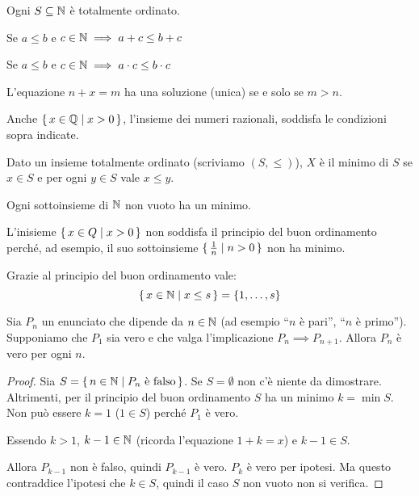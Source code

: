 \begin{remark}
Ogni $S \subseteq \mathbb N$ è totalmente ordinato.
\end{remark}

Se $a \le b$ e $c \in \mathbb N \implies a+c \le b+c$

Se $a \le b$ e $c \in \mathbb N \implies a \cdot c \le b \cdot c$ 

L'equazione $n+x=m$ ha una soluzione (unica) se e solo se $m > n$.

Anche $\set{x \in \mathbb Q| x > 0}$, l'insieme dei numeri razionali, soddisfa le condizioni sopra indicate.

\begin{definition}
Dato un insieme totalmente ordinato (scriviamo $(S, \le)$), $X$ è il minimo di $S$ se $x \in S$ e per ogni $y \in S$ vale $x \le y$.
\end{definition}

\begin{proposition}
Ogni sottoinsieme di $\mathbb N$ non vuoto ha un minimo.
\end{proposition}

\begin{example}
L'inisieme $\set{x \in Q | x > 0}$ non soddisfa il principio del buon ordinamento perché, ad esempio, il suo sottoinsieme $\set{\frac{1}{n} | n > 0}$ non ha minimo.
\end{example}

\begin{remark}
Grazie al principio del buon ordinamento vale: 
\begin{equation*}
\set{x \in \mathbb N| x \le s} = \{1, \ldots, s\}
\end{equation*}
\end{remark}

\begin{proposition}
Sia $P_n$ un enunciato che dipende da $n \in \mathbb N$ (ad esempio ``$n$ è pari'', ``$n$ è primo''). Supponiamo che $P_1$ sia vero e che valga l'implicazione $P_n \implies P_{n+1}$. Allora $P_n$ è vero per ogni $n$.
\end{proposition}

\begin{proof}
Sia $S = \set{n \in \mathbb N| P_n \text{ è falso}}$.
Se $S = \emptyset$ non c'è niente da dimostrare.
Altrimenti, per il principio del buon ordinamento $S$ ha un minimo $k = \min S$. Non può essere $k = 1$ ($1 \in S$) perché $P_1$ è vero.

Essendo $k>1$, $k-1 \in \mathbb N$ (ricorda l'equazione $1+k=x$) e $k-1 \in S$.

Allora $P_{k-1}$ non è falso, quindi $P_{k-1}$ è vero. $P_k$ è vero per ipotesi. Ma questo contraddice l'ipotesi che $k \in S$, quindi il caso $S$ non vuoto non si verifica.
\end{proof}

